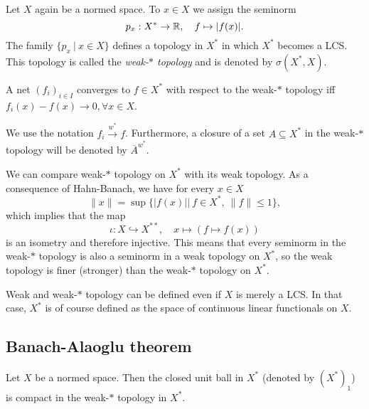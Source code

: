     Let $X$ again be a normed space. To $x \in X$ we assign the seminorm $$p_x: X^* \to \mathbb {R},\quad f \mapsto |f(x)|.$$
    The family $\{p_x\ |\ x \in X\}$ defines a topology in $X^*$ in which $X^*$ becomes a LCS.
    This topology is called the \emph{weak-$*$ topology} and is denoted by $\sigma (X^*, X)$.

\begin{proposition}
    A net $(f_i)_{i \in I}$ converges to $f \in X^*$ with respect to the weak-$*$ topology
    iff $f_i (x)- f (x) \to 0,\forall x \in X$.  
\end{proposition}

\begin{remark}
    We use the notation $f_i \xrightarrow{w^*} f$. Furthermore, a closure of a set $A \subseteq X^*$ in the weak-$*$ topology
    will be denoted by $\overline{A}^{w^*}$.  
\end{remark}

    We can compare weak-$*$ topology on $X^*$ with its weak topology.
    As a consequence of Hahn-Banach, we have for every $x \in X$ $$\| x\| = \sup\{|f(x)||\ f \in X^*,\ \| f\| \leq 1\},$$
    which implies that the map $$\iota: X \hookrightarrow X^{**},\quad x \mapsto (f \mapsto f(x))$$
    is an isometry and therefore injective. This means that every seminorm in the weak-$*$ topology is also 
    a seminorm in a weak topology on $X^*$, so the weak topology is finer (stronger) than the weak-$*$ topology on $X^*$.

\begin{remark}
    Weak and weak-$*$ topology can be defined even if $X$ is merely a LCS.
    In that case, $X^*$ is of course defined as the space of continuous linear functionals on $X$.
\end{remark}

\subsection{Banach-Alaoglu theorem}

\begin{theorem}
    Let $X$ be a normed space. Then the closed unit ball in $X^*$ (denoted by $(X^*)_1$) is compact in the weak-$*$ topology in $X^*$.
\end{theorem}

